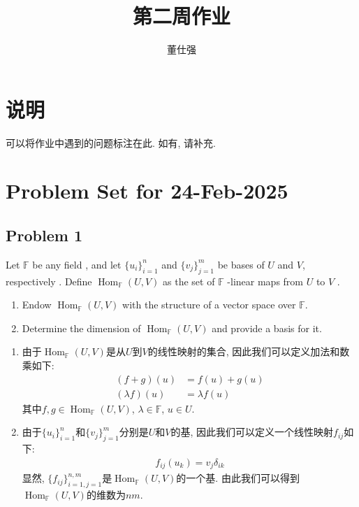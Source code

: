 \documentclass[11pt]{ctexart}
\title{第二周作业}
\author{董仕强}
\theoremstyle{definition}
\numberwithin{equation}{section}
\newcommand{\op}[1]{\operatorname{#1}}%
\newcommand{\FF}{\mathbb{F}}%
\theoremstyle{definition}
\theoremstyle{remark}
\begin{document}
\maketitle

\section{说明}

可以将作业中遇到的问题标注在此. 如有, 请补充.

\tableofcontents

\newpage


\section{Problem Set for 24-Feb-2025}
\subsection{Problem 1}
Let $\FF$ be any field , and let $\{u_i\}_{i=1}^n$ and $\{v_j\}_{j=1}^m$  be bases of $U$ and $V$,
respectively . Define $\op{Hom}_{\FF}(U,V)$ as the set of $\FF$ -linear maps from $U$ to $V$ .
\begin{enumerate}
    \item Endow $\op{Hom}_{\FF}(U,V)$ with the structure of a vector space over $\FF$.
    \item Determine the dimension of $\op{Hom}_{\FF}(U,V)$ and provide a basis for it.
\end{enumerate}
\begin{aaa}
    \begin{enumerate}
        \item 由于$\op{Hom}_{\FF}(U,V)$是从$U$到$V$的线性映射的集合, 因此我们可以定义加法和数乘如下:
        \begin{align*}
            (f+g)(u) &= f(u) + g(u)\\
            (\lambda f)(u) &= \lambda f(u)
        \end{align*}
        其中$f,g\in \op{Hom}_{\FF}(U,V)$, $\lambda\in \FF$, $u\in U$.
        \item 由于$\{u_i\}_{i=1}^n$和$\{v_j\}_{j=1}^m$分别是$U$和$V$的基, 因此我们可以定义一个线性映射$f_{ij}$如下:
        \begin{align*}
            f_{ij}(u_k) = v_j\delta_{ik}
        \end{align*}
        显然, $\{f_{ij}\}_{i=1,j=1}^{n,m}$是$\op{Hom}_{\FF}(U,V)$的一个基. 由此我们可以得到$\op{Hom}_{\FF}(U,V)$的维数为$nm$.
    \end{enumerate}
\end{aaa}
\end{document}
